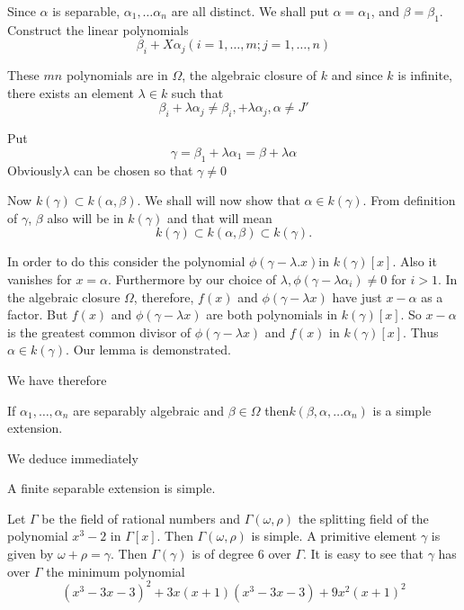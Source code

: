Since $\alpha$ is separable, $\alpha_1 , \ldots \alpha_n$ are all
distinct. We shall put $\alpha = \alpha_1$, and $\beta =
\beta_1$. Construct the linear polynomials  
$$
\beta_i + X \alpha_j (i = 1, \ldots , m; j=1, \ldots , n)
$$

These $mn$ polynomials are in $\Omega$, the algebraic closure of $k$
and since $k$ is infinite, there exists an element $\lambda \in k$
such that  
$$
\beta_i + \lambda \alpha_j \neq \beta_i, + \lambda \alpha_j, \alpha \neq J' 
$$
 
Put
$$
\gamma = \beta_1 + \lambda \alpha_1 = \beta + \lambda \alpha
$$
Obviously\pageoriginale $\lambda$ can be chosen so that $\gamma \neq 0$

Now $k(\gamma) \subset k (\alpha , \beta)$. We shall will now show
that $\alpha \in k(\gamma)$. From definition of $\gamma$, $\beta$ also
will be in $k(\gamma)$ and that will mean  
$$
k(\gamma) \subset k(\alpha , \beta) \subset k(\gamma).
$$

In order to do this consider the polynomial $\phi (\gamma - \lambda
. x)$in  $k (\gamma)[x]$. Also it vanishes for $x =
\alpha$. Furthermore by our choice of $\lambda , \phi(\gamma - \lambda
\alpha_i) \neq 0$ for $i > 1$. In the algebraic closure $\Omega$,
therefore, $f(x)$ and $\phi (\gamma - \lambda x)$ have just $x -
\alpha$ as a factor. But $f(x)$ and $\phi (\gamma - \lambda x)$ are
both polynomials in $k(\gamma)[x]$. So $x - \alpha$ is the greatest
common divisor of $\phi (\gamma - \lambda x)$ and $f(x)$ in
$k(\gamma)[x]$. Thus $\alpha \in k (\gamma)$. Our lemma is
demonstrated. 

We have therefore

\begin{coro*}
If $\alpha_1 , \ldots , \alpha_n$ are separably algebraic
  and $\beta \in \Omega $ then\break $k(\beta , \alpha , \ldots
\alpha_n)$ is a simple extension. 
\end{coro*}


We deduce immediately

\begin{coro*}
 A finite separable extension is simple.
\end{coro*}

Let $\Gamma$ be the field of rational numbers and $\Gamma (\omega ,
\rho)$ the splitting field of the polynomial $x^3 - 2 $ in $\Gamma
       [x]$. Then $\Gamma (\omega , \rho)$ is simple. A primitive
       element $\gamma$ is given by $\omega + \rho = \gamma$.  Then
       $\Gamma(\gamma)$ is of degree $6$ over $\Gamma$. It is easy to
       see that $\gamma$ has over $\Gamma$ the minimum polynomial  
$$
(x^3 - 3x - 3)^2 + 3x (x+1) (x^3 - 3x - 3) + 9x^2 (x + 1)^2
$$

